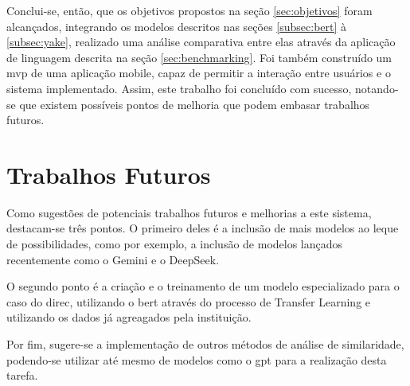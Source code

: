 Conclui-se, então, que os objetivos propostos na seção \ref{sec:objetivos} foram alcançados, integrando os modelos descritos nas seções \ref{subsec:bert} à \ref{subsec:yake}, realizado uma análise comparativa entre elas através da aplicação de linguagem descrita na seção \ref{sec:benchmarking}. Foi também construído um \gls{mvp} de uma aplicação mobile, capaz de permitir a interação entre usuários e o sistema implementado. Assim, este trabalho foi concluído com sucesso, notando-se que existem possíveis pontos de melhoria que podem embasar trabalhos futuros.

\section{Trabalhos Futuros}\label{sec:futuro}

Como sugestões de potenciais trabalhos futuros e melhorias a este sistema, destacam-se três pontos. O primeiro deles é a inclusão de mais modelos ao leque de possibilidades, como por exemplo, a inclusão de modelos lançados recentemente como o Gemini e o DeepSeek.

O segundo ponto é a criação e o treinamento de um modelo especializado para o caso do \gls{direc}, utilizando o \gls{bert} através do processo de Transfer Learning e utilizando os dados já agreagados pela instituição.

Por fim, sugere-se a implementação de outros métodos de análise de similaridade, podendo-se utilizar até mesmo de modelos como o \gls{gpt} para a realização desta tarefa.
